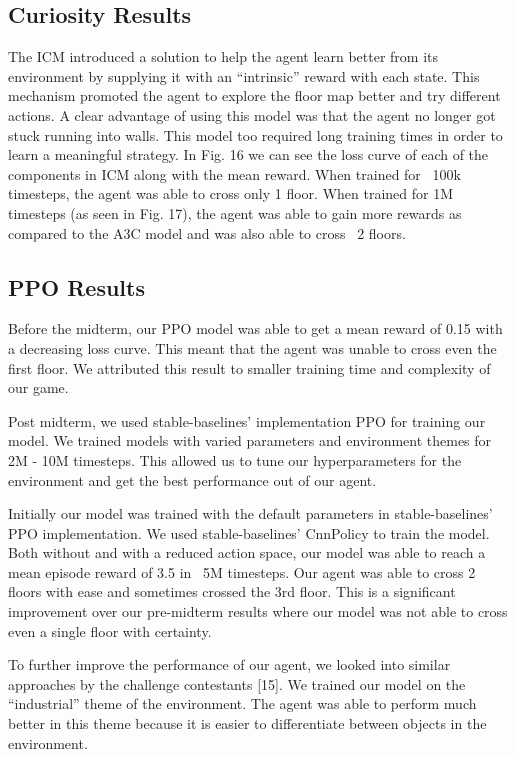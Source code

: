 \documentclass[conference]{IEEEtran}
\begin{document}
\subsection{Curiosity Results}

The ICM introduced a solution to help the agent learn better from its environment by supplying it with an “intrinsic” reward with each state. This mechanism promoted the agent to explore the floor map better and try different actions. A clear advantage of using this model was that the agent no longer got stuck running into walls. This model too required long training times in order to learn a meaningful strategy. In Fig. 16 we can see the loss curve of each of the components in ICM along with the mean reward. When trained for ~100k timesteps, the agent was able to cross only 1 floor. When trained for 1M timesteps (as seen in Fig. 17), the agent was able to gain more rewards as compared to the A3C model and was also able to cross ~2 floors.

\subsection{PPO Results}

Before the midterm, our PPO model was able to get a mean reward of 0.15 with a decreasing loss curve. This meant that the agent was unable to cross even the first floor. We attributed this result to smaller training time and complexity of our game. 

Post midterm, we used stable-baselines’ implementation PPO for training our model. We trained models with varied parameters and environment themes for 2M - 10M timesteps. This allowed us to tune our hyperparameters for the environment and get the best performance out of our agent. 

Initially our model was trained with the default parameters in stable-baselines’ PPO implementation. We used stable-baselines’ CnnPolicy to train the model. Both without and with a reduced action space, our model was able to reach a mean episode reward of 3.5 in ~5M timesteps. Our agent was able to cross 2 floors with ease and sometimes crossed the 3rd floor. This is a significant improvement over our pre-midterm results where our model was not able to cross even a single floor with certainty.

To further improve the performance of our agent, we looked into similar approaches by the challenge contestants [15]. We trained our model on the “industrial” theme of the environment. The agent was able to perform much better in this theme because it is easier to differentiate between objects in the environment. 
\end{document}
